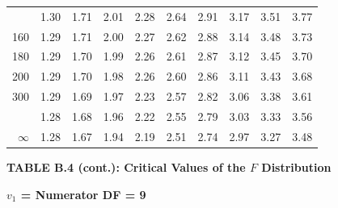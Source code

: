 \documentclass[10pt]{article}
\begin{document}
\begin{longtable}{@{}r!{\vrule width 0.8pt\hspace{0.55em}}rrrrrrrrr@{}}
 & 1.30 & 1.71 & 2.01 & 2.28 & 2.64 & 2.91 & 3.17 & 3.51 & 3.77 \\
160 & 1.29 & 1.71 & 2.00 & 2.27 & 2.62 & 2.88 & 3.14 & 3.48 & 3.73 \\
180 & 1.29 & 1.70 & 1.99 & 2.26 & 2.61 & 2.87 & 3.12 & 3.45 & 3.70 \\
200 & 1.29 & 1.70 & 1.98 & 2.26 & 2.60 & 2.86 & 3.11 & 3.43 & 3.68 \\
300 & 1.29 & 1.69 & 1.97 & 2.23 & 2.57 & 2.82 & 3.06 & 3.38 & 3.61 \\
 & 1.28 & 1.68 & 1.96 & 2.22 & 2.55 & 2.79 & 3.03 & 3.33 & 3.56 \\
$\infty$ & 1.28 & 1.67 & 1.94 & 2.19 & 2.51 & 2.74 & 2.97 & 3.27 & 3.48 \\
\end{longtable}
\newpage
\thispagestyle{empty}
\begin{center}
{\large\bfseries TABLE B.4 (cont.): Critical Values of the $F$ Distribution\par}
\end{center}
{\large\bfseries $v_1$ = Numerator DF = 9\par}
\vspace{0.5em}
\small
\end{document}

